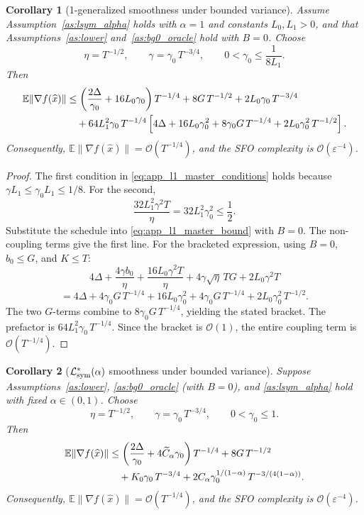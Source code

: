 \documentclass[letter,11pt]{article}
\newtheorem{corollary}{Corollary}[theorem]
\newcommand{\E}{\mathbb{E}}
\newcommand{\Ocal}{\mathcal{O}}
\newcommand{\Lcal}{\mathcal{L}}
\begin{document}
\begin{corollary}[1-generalized smoothness under bounded variance]
\label{cor:app_nsgdm_sym1_bv}
Assume Assumption~\ref{as:lsym_alpha} holds with $\alpha=1$ and constants
$L_0, L_1>0$, and that Assumptions~\ref{as:lower} and~\ref{as:bg0_oracle}
hold with $B=0$. Choose
\[
    \eta = T^{-1/2},
    \qquad
    \gamma = \gamma_0\,T^{-3/4},
    \qquad
    0 < \gamma_0 \le \frac{1}{8L_1}.
\]
Then
\begin{align}
    \E\|\nabla f(\widehat x)\|
    &\le
    \left(
        \frac{2\Delta}{\gamma_0}
        + 16L_0\gamma_0
    \right) T^{-1/4}
    + 8G\,T^{-1/2}
    + 2L_0\gamma_0\,T^{-3/4}
    \notag\\
    &\quad
    + 64L_1^2\gamma_0\,T^{-1/4}
    \left[
        4\Delta
        + 16L_0\gamma_0^2
        + 8\gamma_0 G\,T^{-1/4}
        + 2L_0\gamma_0^2\,T^{-1/2}
    \right].
    \label{eq:app_sym1_bv_final}
\end{align}
Consequently,
$\E\|\nabla f(\widehat x)\| = \Ocal(T^{-1/4})$,
and the SFO complexity is $\Ocal(\varepsilon^{-4})$.
\end{corollary}

\begin{proof}
The first condition in \eqref{eq:app_l1_master_conditions} holds because
$\gamma L_1 \le \gamma_0 L_1 \le 1/8$. For the second,
\[
    \frac{32L_1^2\gamma^2 T}{\eta}
    = 32L_1^2\gamma_0^2
    \le \frac{1}{2}.
\]
Substitute the schedule into \eqref{eq:app_l1_master_bound} with $B=0$. The
non-coupling terms give the first line. For the bracketed expression, using
$B=0$, $b_0\le G$, and $K\le T$:
\[
    4\Delta
    + \frac{4\gamma b_0}{\eta}
    + \frac{16L_0\gamma^2 T}{\eta}
    + 4\gamma\sqrt{\eta}\,TG
    + 2L_0\gamma^2 T
\]
\[
    = 4\Delta
    + 4\gamma_0 G\,T^{-1/4}
    + 16L_0\gamma_0^2
    + 4\gamma_0 G\,T^{-1/4}
    + 2L_0\gamma_0^2\,T^{-1/2}.
\]
The two $G$-terms combine to $8\gamma_0 G\,T^{-1/4}$, yielding the stated
bracket. The prefactor is $64L_1^2\gamma_0\,T^{-1/4}$. Since the bracket is
$\Ocal(1)$, the entire coupling term is $\Ocal(T^{-1/4})$.
\end{proof}

\begin{corollary}[$\Lcal_{\rm sym}^*(\alpha)$ smoothness under bounded variance]
\label{cor:app_alpha_bv}
Suppose Assumptions~\ref{as:lower}, \ref{as:bg0_oracle} (with $B=0$), and
\ref{as:lsym_alpha} hold with fixed $\alpha\in(0,1)$. Choose
\[
    \eta = T^{-1/2},
    \qquad
    \gamma = \gamma_0\,T^{-3/4},
    \qquad
    0 < \gamma_0 \le 1.
\]
Then
\begin{align}
    \E\|\nabla f(\widehat x)\|
    &\le
    \left(
        \frac{2\Delta}{\gamma_0}
        + 4\widetilde C_\alpha\gamma_0
    \right) T^{-1/4}
    + 8G\,T^{-1/2}
    \notag\\
    &\quad
    + K_0\gamma_0\,T^{-3/4}
    + 2C_\alpha\gamma_0^{1/(1-\alpha)}\,T^{-3/(4(1-\alpha))}.
    \label{eq:app_alpha_bv_final}
\end{align}
Consequently,
$\E\|\nabla f(\widehat x)\| = \Ocal(T^{-1/4})$,
and the SFO complexity is $\Ocal(\varepsilon^{-4})$.
\end{corollary}
\end{document}
